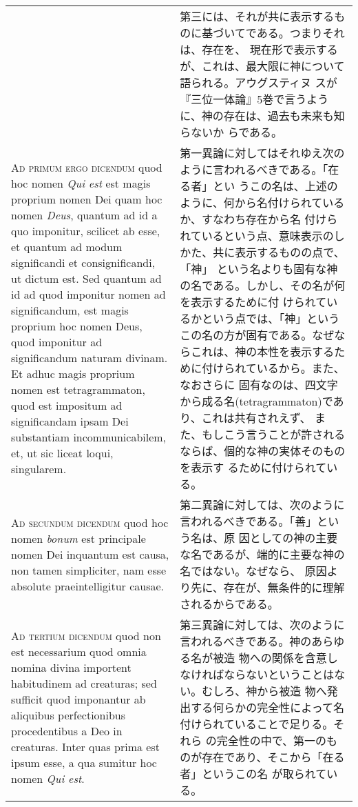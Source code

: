 \documentclass[10pt]{jsarticle}
\begin{document}
\begin{longtable}{p{21em}p{21em}}
&

第三には、それが共に表示するものに基づいてである。つまりそれは、存在を、
現在形で表示するが、これは、最大限に神について語られる。アウグスティヌ
スが『三位一体論』5巻で言うように、神の存在は、過去も未来も知らないか
らである。

\\

{\scshape Ad primum ergo dicendum} quod hoc nomen {\itshape Qui est}
est magis proprium nomen Dei quam hoc nomen {\itshape Deus}, quantum
ad id a quo imponitur, scilicet ab esse, et quantum ad modum
significandi et consignificandi, ut dictum est. Sed quantum ad id ad
quod imponitur nomen ad significandum, est magis proprium hoc nomen
Deus, quod imponitur ad significandum naturam divinam. Et adhuc magis
proprium nomen est tetragrammaton, quod est impositum ad significandam
ipsam Dei substantiam incommunicabilem, et, ut sic liceat loqui,
singularem.

&

第一異論に対してはそれゆえ次のように言われるべきである。「在る者」とい
うこの名は、上述のように、何から名付けられているか、すなわち存在から名
付けられているという点、意味表示のしかた、共に表示するものの点で、「神」
という名よりも固有な神の名である。しかし、その名が何を表示するために付
けられているかという点では、「神」というこの名の方が固有である。なぜな
らこれは、神の本性を表示するために付けられているから。また、なおさらに
固有なのは、四文字から成る名(tetragrammaton)であり、これは共有されえず、
また、もしこう言うことが許されるならば、個的な神の実体そのものを表示す
るために付けられている。

\\

{\scshape Ad secundum dicendum} quod hoc nomen {\itshape bonum} est
principale nomen Dei inquantum est causa, non tamen simpliciter, nam
esse absolute praeintelligitur causae.

&

第二異論に対しては、次のように言われるべきである。「善」という名は、原
因としての神の主要な名であるが、端的に主要な神の名ではない。なぜなら、
原因より先に、存在が、無条件的に理解されるからである。

\\

{\scshape Ad tertium dicendum} quod non est necessarium quod omnia
nomina divina importent habitudinem ad creaturas; sed sufficit quod
imponantur ab aliquibus perfectionibus procedentibus a Deo in
creaturas. Inter quas prima est ipsum esse, a qua sumitur hoc nomen
{\itshape Qui est}.

&

第三異論に対しては、次のように言われるべきである。神のあらゆる名が被造
物への関係を含意しなければならないということはない。むしろ、神から被造
物へ発出する何らかの完全性によって名付けられていることで足りる。それら
の完全性の中で、第一のものが存在であり、そこから「在る者」というこの名
が取られている。

\end{longtable}
\end{document}
